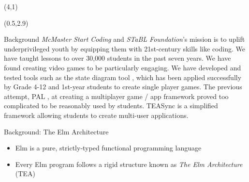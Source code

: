 \documentclass[22pt]{beamer}
\begin{document}
\begin{frame}[fragile]
    \begin{textblock}{8}(4,1)
        \titlepage
    \end{textblock}

    \begin{textblock}{7.25}(0.5,2.9)

        \begin{block}{\fontsize{37}{20}\selectfont Background}
            \textit{McMaster Start Coding} and \textit{STaBL Foundation}'s mission is to uplift underprivileged
            youth by equipping them with 21st-century skills like coding. We have taught lessons to over
            30,000 students in the past seven years. We have found creating video games to be particularly
            engaging. We have developed and tested tools such as the state diagram tool
            \cite{pasupathi2022teaching}, which has been applied successfully by Grade 4-12 and 1st-year
            students to create single player games. The previous attempt, PAL \cite{schankula2020newyouthhack}, at creating a
            multiplayer game / app framework proved too complicated to be reasonably used by students. TEASync
            is a simplified framework allowing students to create multi-user applications.
            \vspace{5mm}
        \end{block}

        \begin{block}{\fontsize{37}{20}\selectfont Background: The Elm Architecture}
            \begin{itemize}
                \item Elm is a pure, strictly-typed functional programming language
                \item Every Elm program follows a rigid structure known as \textit{The Elm Architecture} (TEA)
            \end{itemize}
            \vspace{-6mm}
        \end{block}


\end{textblock}
\end{frame}
\end{document}
